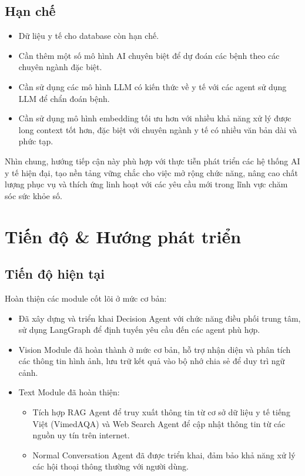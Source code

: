 \subsection{Hạn chế}

\begin{itemize}
    \item Dữ liệu y tế cho database còn hạn chế.
    \item Cần thêm một số mô hình AI chuyên biệt để dự đoán các bệnh theo các chuyên ngành đặc biệt.
    \item Cần sử dụng các mô hình LLM có kiến thức về y tế với các agent sử dụng LLM để chẩn đoán bệnh.
    \item Cần sử dụng mô hình embedding tối ưu hơn với nhiều khả năng xử lý được long context tốt hơn, đặc biệt với chuyên ngành y tế có nhiều văn bản dài và phức tạp.
\end{itemize}

Nhìn chung, hướng tiếp cận này phù hợp với thực tiễn phát triển các hệ thống AI y tế hiện đại, tạo nền tảng vững chắc cho việc mở rộng chức năng, nâng cao chất lượng phục vụ và thích ứng linh hoạt với các yêu cầu mới trong lĩnh vực chăm sóc sức khỏe số.

\section{Tiến độ \& Hướng phát triển}

\subsection{Tiến độ hiện tại}

Hoàn thiện các module cốt lõi ở mức cơ bản:

\begin{itemize}
    \item Đã xây dựng và triển khai Decision Agent với chức năng điều phối trung tâm, sử dụng LangGraph để định tuyến yêu cầu đến các agent phù hợp.
    \item Vision Module đã hoàn thành ở mức cơ bản, hỗ trợ nhận diện và phân tích các thông tin hình ảnh, lưu trữ kết quả vào bộ nhớ chia sẻ để duy trì ngữ cảnh.
    \item Text Module đã hoàn thiện:
    \begin{itemize}
        \item Tích hợp RAG Agent để truy xuất thông tin từ cơ sở dữ liệu y tế tiếng Việt (VimedAQA) và Web Search Agent để cập nhật thông tin từ các nguồn uy tín trên internet.
        \item Normal Conversation Agent đã được triển khai, đảm bảo khả năng xử lý các hội thoại thông thường với người dùng.
    \end{itemize}
\end{itemize}

